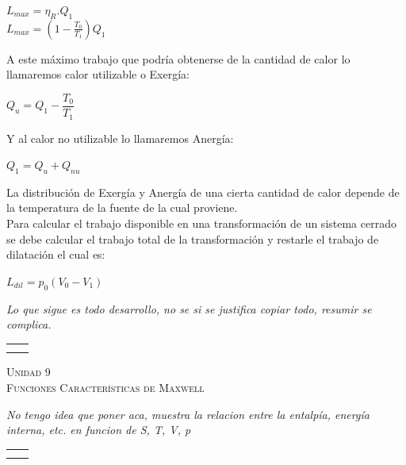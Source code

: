 \documentclass[11pt,a4paper,twocolumn]{article}
\newcommand{\unidad}[2]{\begin{center}
		\fontsize{10}{10}\selectfont\color{gray!50!black}\scshape Unidad #1 \\
		\fontsize{14}{14}\selectfont \scshape #2
\end{center}}
\begin{document}
	\begin{center}
		$L_{max}= \eta_{R} .Q_{1}$\\
		$L_{max}=(1-\frac{T_{0}}{T_{1}})Q_{1}$\\
	\end{center}
	A este máximo trabajo que podría obtenerse de la cantidad de calor lo llamaremos calor utilizable o Exergía:	
	\begin{center}
	$Q_{u}=Q_{1}-\dfrac{T_{0}}{T_{1}}$\\
	\end{center}
	Y al calor no utilizable lo llamaremos Anergía:
	\begin{center}
		$Q_{1}=Q_{u}+Q_{nu}$\\
	\end{center}
	La distribución de Exergía y Anergía de una cierta cantidad de calor depende de la temperatura de la fuente de la cual proviene.\\ %
	Para calcular el trabajo disponible en  una transformación de un sistema cerrado se debe calcular el trabajo total de la transformación y restarle el trabajo de dilatación el cual es:
	\begin{center}
	$L_{dil}=p_{0}(V_{0}-V_{1})$\\
	\end{center}

\textit{Lo que sigue es todo desarrollo, no se si se justifica copiar todo, resumir se complica.}\\
	\begin{tabular}{r | l} \vspace{.2cm}
		& \\ \vspace{.2cm}
		& \\ 
		
	\end{tabular}
	
	\unidad{9}{Funciones Características de Maxwell}
	\textit{No tengo idea que poner aca, muestra la relacion entre la entalpía, energía interna, etc. en funcion de S, T, V, p}\\	
	
	\begin{tabular}{r | l} \vspace{.2cm}
		& \\ \vspace{.2cm}
		& \\ 
		
	\end{tabular}
	
\end{document}
